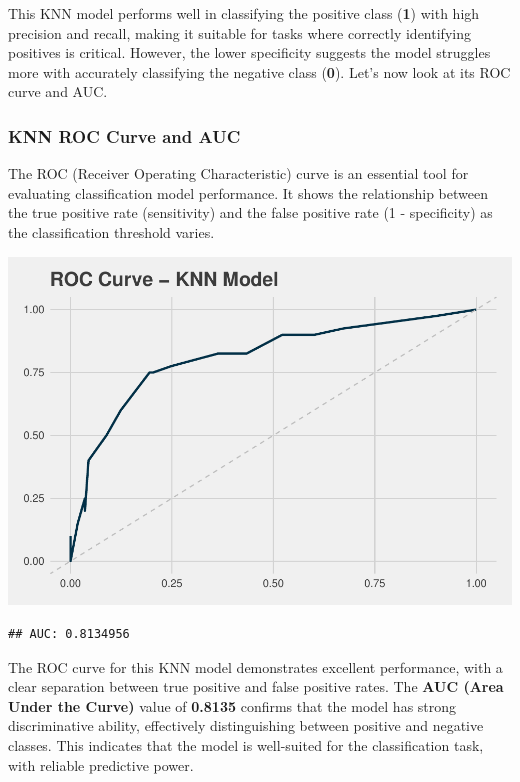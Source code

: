 \documentclass[
]{article}
\begin{document}
This KNN model performs well in classifying the positive class
(\textbf{1}) with high precision and recall, making it suitable for
tasks where correctly identifying positives is critical. However, the
lower specificity suggests the model struggles more with accurately
classifying the negative class (\textbf{0}). Let's now look at its ROC
curve and AUC.

\newpage

\subsubsection{KNN ROC Curve and AUC}\label{knn-roc-curve-and-auc}

The ROC (Receiver Operating Characteristic) curve is an essential tool
for evaluating classification model performance. It shows the
relationship between the true positive rate (sensitivity) and the false
positive rate (1 - specificity) as the classification threshold varies.

\begin{center}\includegraphics{Diabetes-Project_files/figure-latex/roc knn-1} \end{center}

\begin{verbatim}
## AUC: 0.8134956
\end{verbatim}

The ROC curve for this KNN model demonstrates excellent performance,
with a clear separation between true positive and false positive rates.
The \textbf{AUC (Area Under the Curve)} value of \textbf{0.8135}
confirms that the model has strong discriminative ability, effectively
distinguishing between positive and negative classes. This indicates
that the model is well-suited for the classification task, with reliable
predictive power.
\end{document}
